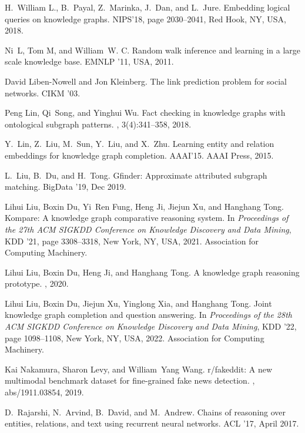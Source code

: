\documentclass[11pt]{article}
\begin{document}
\begin{thebibliography}{10}
H.~William L., B.~Payal, Z.~Marinka, J.~Dan, and L.~Jure.
\newblock Embedding logical queries on knowledge graphs.
\newblock NIPS’18, page 2030–2041, Red Hook, NY, USA, 2018.

Ni~L, Tom M, and William~W. C.
\newblock Random walk inference and learning in a large scale knowledge base.
\newblock EMNLP ’11, USA, 2011.

David Liben-Nowell and Jon Kleinberg.
\newblock The link prediction problem for social networks.
\newblock CIKM '03.

Peng Lin, Qi~Song, and Yinghui Wu.
\newblock Fact checking in knowledge graphs with ontological subgraph patterns.
, 3(4):341--358, 2018.

Y.~Lin, Z.~Liu, M.~Sun, Y.~Liu, and X.~Zhu.
\newblock Learning entity and relation embeddings for knowledge graph
  completion.
\newblock AAAI'15. AAAI Press, 2015.

L.~{Liu}, B.~{Du}, and H.~{Tong}.
\newblock Gfinder: Approximate attributed subgraph matching.
\newblock BigData '19, Dec 2019.

Lihui Liu, Boxin Du, Yi~Ren Fung, Heng Ji, Jiejun Xu, and Hanghang Tong.
\newblock Kompare: A knowledge graph comparative reasoning system.
\newblock In {\em Proceedings of the 27th ACM SIGKDD Conference on Knowledge
  Discovery and Data Mining}, KDD '21, page 3308–3318, New York, NY, USA,
  2021. Association for Computing Machinery.

Lihui Liu, Boxin Du, Heng Ji, and Hanghang Tong.
\newblock A knowledge graph reasoning prototype.
, 2020.

Lihui Liu, Boxin Du, Jiejun Xu, Yinglong Xia, and Hanghang Tong.
\newblock Joint knowledge graph completion and question answering.
\newblock In {\em Proceedings of the 28th ACM SIGKDD Conference on Knowledge
  Discovery and Data Mining}, KDD '22, page 1098–1108, New York, NY, USA,
  2022. Association for Computing Machinery.

Kai Nakamura, Sharon Levy, and William~Yang Wang.
\newblock r/fakeddit: {A} new multimodal benchmark dataset for fine-grained
  fake news detection.
, abs/1911.03854, 2019.

D.~Rajarshi, N.~Arvind, B.~David, and M.~Andrew.
\newblock Chains of reasoning over entities, relations, and text using
  recurrent neural networks.
\newblock ACL '17, April 2017.


\end{thebibliography}
\end{document}
